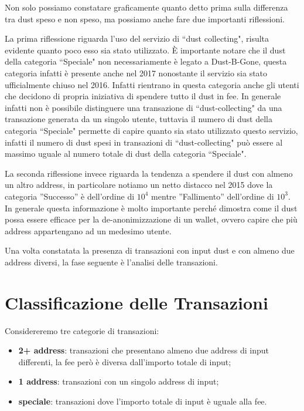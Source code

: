 Non solo possiamo constatare graficamente quanto detto prima sulla differenza tra dust speso e non speso, ma possiamo anche fare due importanti riflessioni. 

La prima riflessione riguarda l'uso del servizio di ``dust collecting", risulta evidente quanto poco esso sia stato utilizzato. È importante notare che il dust della categoria ``Speciale" non necessariamente è legato a Dust-B-Gone, questa categoria infatti è presente anche nel 2017 nonostante il servizio sia stato ufficialmente chiuso nel 2016. Infatti rientrano in questa categoria anche gli utenti che decidono di propria iniziativa di spendere tutto il dust in fee. In generale infatti non è possibile distinguere una transazione di ``dust-collecting" da una transazione generata da un singolo utente, tuttavia il numero di dust della categoria ``Speciale" permette di capire quanto sia stato utilizzato questo servizio, infatti il numero di dust spesi in transazioni di ``dust-collecting" può essere al massimo uguale al numero totale di dust della categoria ``Speciale".  

La seconda riflessione invece riguarda la tendenza a spendere il dust con almeno un altro address, in particolare notiamo un netto distacco nel 2015 dove la categoria ”Successo” è dell’ordine di $10^4$ mentre ”Fallimento” dell’ordine di $10^3$. In generale questa informazione è molto importante perché dimostra come il dust possa essere efficace per la de-anonimizzazione di un wallet, ovvero capire che più address appartengano ad un medesimo utente.

Una volta constatata la presenza di transazioni con input dust e con almeno due address diversi, la fase seguente è l'analisi delle transazioni. 
\section{Classificazione delle Transazioni}
Considereremo tre categorie di transazioni: 
\begin{itemize}
    \item \textbf{2+ address}: transazioni che presentano almeno due address di input differenti, la fee però è diversa dall'importo totale di input;
    \item \textbf{1 address}: transazioni con un singolo address di input;
    \item \textbf{speciale}: transazioni dove l'importo totale di input è uguale alla fee.
\end{itemize}

